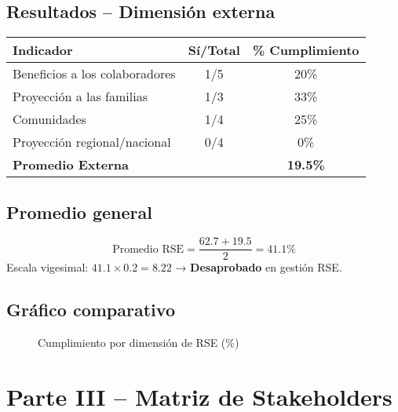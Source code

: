 \documentclass[a4paber,12pt]{article}
\begin{document}
	\subsection{Resultados – Dimensión externa}
	
	\begin{center}
		\begin{tabular}{|l|c|c|}
			\hline
			\textbf{Indicador} & \textbf{Sí/Total} & \textbf{\% Cumplimiento} \\
			\hline
			Beneficios a los colaboradores & 1/5 & 20\% \\
			Proyección a las familias & 1/3 & 33\% \\
			Comunidades & 1/4 & 25\% \\
			Proyección regional/nacional & 0/4 & 0\% \\
			\hline
			\textbf{Promedio Externa} & & \textbf{19.5\%} \\
			\hline
		\end{tabular}
	\end{center}
	
	\subsection{Promedio general}
	\[
	\text{Promedio RSE} = \frac{62.7 + 19.5}{2} = 41.1\%
	\]
	Escala vigesimal: \( 41.1 \times 0.2 = 8.22 \) → \textbf{Desaprobado} en gestión RSE.
	\newpage
	\subsection{Gráfico comparativo}
	
	\begin{figure}[h!]
		\centering
		\caption{Cumplimiento por dimensión de RSE (\%)}
	\end{figure}
	
	\newpage
	
	\section*{Parte III – Matriz de Stakeholders}
	
\end{document}
